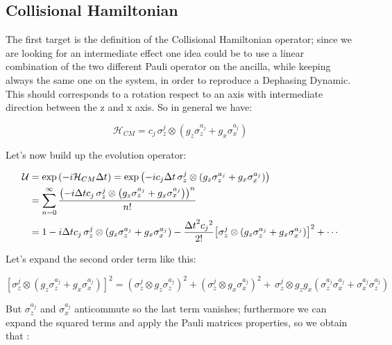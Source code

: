 \documentclass[a4paper,12pt]{article}
\begin{document}
	\subsection{Collisional Hamiltonian}
	The first target is the definition of the Collisional Hamiltonian operator; since we are looking for an intermediate effect one idea could be to use a linear combination of the two different Pauli operator on the ancilla, while keeping always the same one on the system, in order to reproduce a Dephasing Dynamic. This should corresponds to a rotation respect to an axis with intermediate direction between the z and x axis. So in general we have:
	
	\begin{equation}
		\mathcal{H}_{CM} = c_{j} \, \sigma_{z}^{j} \otimes \left(g_{z} \sigma_{z}^{a_j} + g_{x} \sigma_{x}^{a_j} \right) 
	\end{equation} 
	
	Let's now build up the evolution operator: 
	
	\begin{align}
		\mathcal{U} &= \exp{\left( -i \mathcal{H}_{CM} \Delta t \right)} = \exp{\left( -i c_{j} \Delta t \, \sigma_{z}^{j} \otimes \left(g_{z} \sigma_{z}^{a_j} + g_{x} \sigma_{x}^{a_j} \right) \right)} \\
		&= \sum_{n=0}^{\infty}{\frac{\left(-i \Delta t c_{j} \, \sigma_{z}^{j} \otimes \left(g_{z} \sigma_{z}^{a_j} + g_{x} \sigma_{x}^{a_j} \right) \right)^n}{n!}} \\
		&= 1 - i \Delta t c_{j} \, \sigma_{z}^{j} \otimes \left(g_{z} \sigma_{z}^{a_j} + g_{x} \sigma_{x}^{a_j} \right) - \frac{{\Delta t}^{2} {c_j}^{2}}{2!} {\left[\sigma_{z}^{j} \otimes \left(g_{z} \sigma_{z}^{a_j} + g_{x} \sigma_{x}^{a_j} \right)\right]}^{2} + \cdots \notag
	\end{align}
	
	Let's expand the second order term like this:
	
	\begin{equation}
		{\left[\sigma_{z}^{j} \otimes \left(g_{z} \sigma_{z}^{a_j} + g_{x} \sigma_{x}^{a_j} \right)\right]}^{2} = {\left(\sigma_{z}^{j} \otimes g_{z} \sigma_{z}^{a_j} \right)}^{2} + {\left(\sigma_{z}^{j} \otimes g_{x} \sigma_{x}^{a_j} \right)}^{2} + \, \sigma_{z}^{j} \otimes g_{z}g_{x}\left( \sigma_{z}^{a_j}\sigma_{x}^{a_j} + \sigma_{x}^{a_j}\sigma_{z}^{a_j} \right)
	\end{equation}
	
	\begin{flushleft}
		But $ \sigma_{z}^{a_j} $ and $ \sigma_{x}^{a_j} $ anticommute so the last term vanishes; furthermore we can expand the squared terms and apply the Pauli matrices properties, so we obtain that :
	\end{flushleft}
	  
\end{document}
